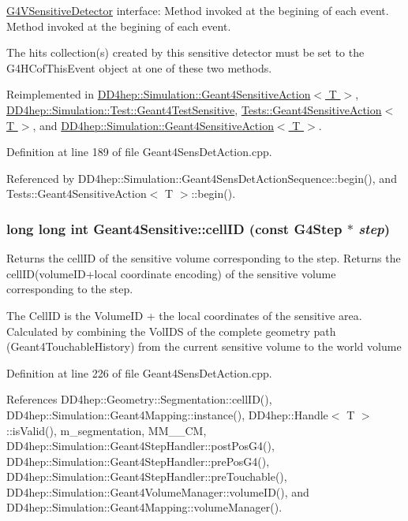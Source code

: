 \hyperlink{class_g4_v_sensitive_detector}{G4VSensitiveDetector} interface: Method invoked at the begining of each event. Method invoked at the begining of each event.

The hits collection(s) created by this sensitive detector must be set to the G4HCofThisEvent object at one of these two methods. 

Reimplemented in \hyperlink{class_d_d4hep_1_1_simulation_1_1_geant4_sensitive_action_a2e9739b3741bb245e3cc7edb41e7374d}{DD4hep::Simulation::Geant4SensitiveAction$<$ T $>$}, \hyperlink{class_d_d4hep_1_1_simulation_1_1_test_1_1_geant4_test_sensitive_a7d7593372b9bfcc1e1a3f21ceef841d8}{DD4hep::Simulation::Test::Geant4TestSensitive}, \hyperlink{class_tests_1_1_geant4_sensitive_action_a739fa2551e0217a591c5e99ae09d883a}{Tests::Geant4SensitiveAction$<$ T $>$}, and \hyperlink{class_d_d4hep_1_1_simulation_1_1_geant4_sensitive_action_aa038cfe9345e32eccee5b0022b2b48c4}{DD4hep::Simulation::Geant4SensitiveAction$<$ T $>$}.

Definition at line 189 of file Geant4SensDetAction.cpp.

Referenced by DD4hep::Simulation::Geant4SensDetActionSequence::begin(), and Tests::Geant4SensitiveAction$<$ T $>$::begin().\hypertarget{class_d_d4hep_1_1_simulation_1_1_geant4_sensitive_a1e79173455ccff4d70cd1325b26ad3e9}{
\subsubsection[{cellID}]{\setlength{\rightskip}{0pt plus 5cm}long long int Geant4Sensitive::cellID (const G4Step $\ast$ {\em step})}}
\label{class_d_d4hep_1_1_simulation_1_1_geant4_sensitive_a1e79173455ccff4d70cd1325b26ad3e9}


Returns the cellID of the sensitive volume corresponding to the step. Returns the cellID(volumeID+local coordinate encoding) of the sensitive volume corresponding to the step.

The CellID is the VolumeID + the local coordinates of the sensitive area. Calculated by combining the VolIDS of the complete geometry path (Geant4TouchableHistory) from the current sensitive volume to the world volume 

Definition at line 226 of file Geant4SensDetAction.cpp.

References DD4hep::Geometry::Segmentation::cellID(), DD4hep::Simulation::Geant4Mapping::instance(), DD4hep::Handle$<$ T $>$::isValid(), m\_\-segmentation, MM\_\_\-CM, DD4hep::Simulation::Geant4StepHandler::postPosG4(), DD4hep::Simulation::Geant4StepHandler::prePosG4(), DD4hep::Simulation::Geant4StepHandler::preTouchable(), DD4hep::Simulation::Geant4VolumeManager::volumeID(), and DD4hep::Simulation::Geant4Mapping::volumeManager().


